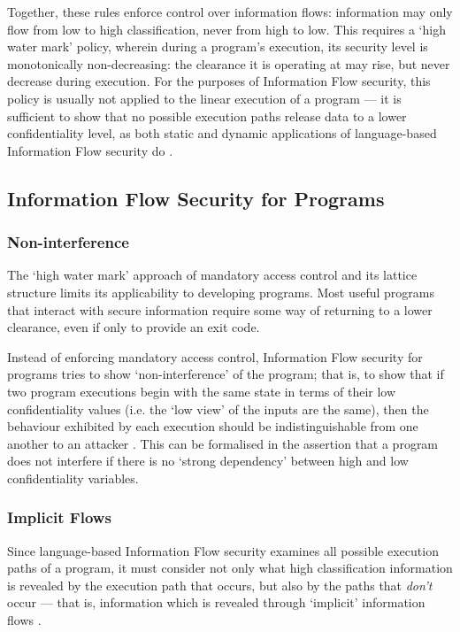 Together, these rules enforce control over information flows: information may only flow from low to high classification, never from high to low. This requires a `high water mark' \cite{jones1975highwatermark} policy, wherein during a program's execution, its security level is monotonically non-decreasing: the clearance it is operating at may rise, but never decrease during execution. For the purposes of Information Flow security, this policy is usually not applied to the linear execution of a program --- it is sufficient to show that no possible execution paths release data to a lower confidentiality level, as both static and dynamic applications of language-based Information Flow security do \cite{sabelfeld2003if}.

\subsection{Information Flow Security for Programs}

\subsubsection{Non-interference}

The `high water mark' approach of mandatory access control and its lattice structure limits its applicability to developing programs. Most useful programs that interact with secure information require some way of returning to a lower clearance, even if only to provide an exit code.

Instead of enforcing mandatory access control, Information Flow security for programs tries to show `non-interference' of the program; that is, to show that if two program executions begin with the same state in terms of their low confidentiality values (i.e. the `low view' of the inputs are the same), then the behaviour exhibited by each execution should be indistinguishable from one another to an attacker \cite{sabelfeld2003if}. This can be formalised in the assertion that a program does not interfere if there is no `strong dependency' \cite{cohen1977declassification} between high and low confidentiality variables.

\subsubsection{Implicit Flows}

Since language-based Information Flow security examines all possible execution paths of a program, it must consider not only what high classification information is revealed by the execution path that occurs, but also by the paths that \textit{don't} occur --- that is, information which is revealed through `implicit' information flows \cite{sabelfeld2003if}.

